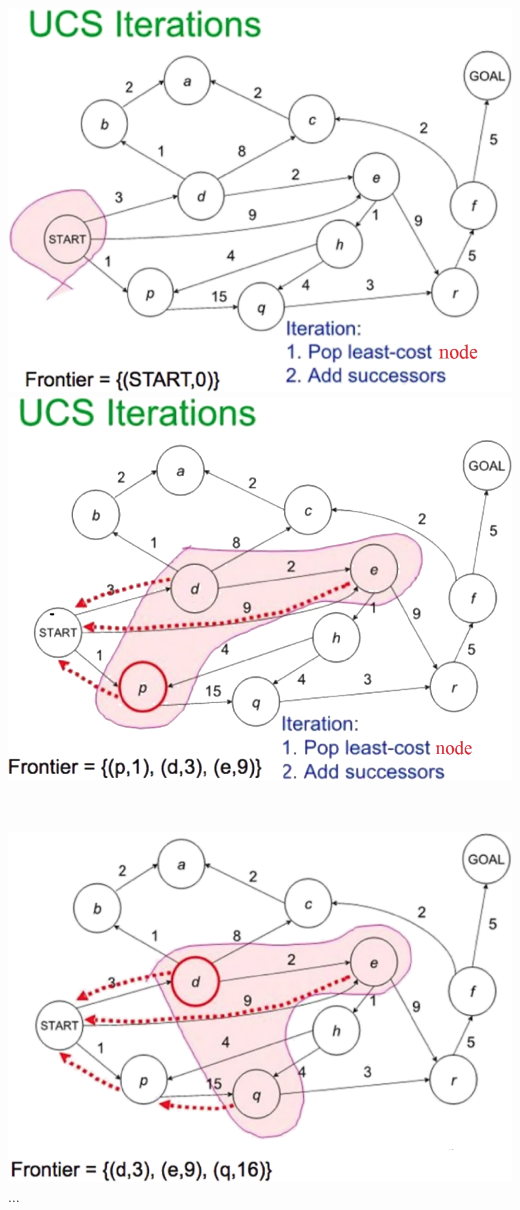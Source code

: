 \begin{center}
    \includegraphics[width=0.45\linewidth]{figures/ucs-1.png}
    \hfill
    \includegraphics[width=0.45\linewidth]{figures/ucs-2.png}

    {~~~}

    \includegraphics[width=0.45\linewidth]{figures/ucs-3.png}
    \hfill
    $\dots$
\end{center}

